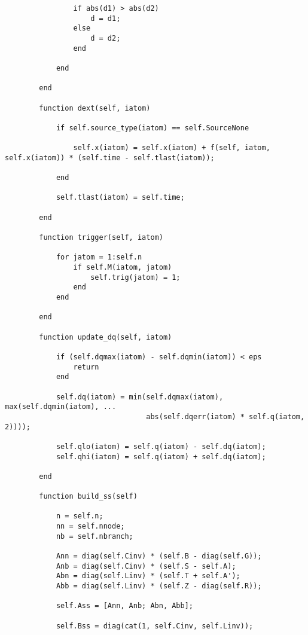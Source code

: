 \begin{lstlisting}
                if abs(d1) > abs(d2)
                    d = d1;
                else
                    d = d2;
                end
                
            end
        
        end
        
        function dext(self, iatom)
            
            if self.source_type(iatom) == self.SourceNone
                
                self.x(iatom) = self.x(iatom) + f(self, iatom, self.x(iatom)) * (self.time - self.tlast(iatom));
            
            end
            
            self.tlast(iatom) = self.time;

        end 
        
        function trigger(self, iatom)
            
            for jatom = 1:self.n
                if self.M(iatom, jatom)
                    self.trig(jatom) = 1;
                end
            end
            
        end
        
        function update_dq(self, iatom)
            
            if (self.dqmax(iatom) - self.dqmin(iatom)) < eps
                return
            end
            
            self.dq(iatom) = min(self.dqmax(iatom), max(self.dqmin(iatom), ...
                                 abs(self.dqerr(iatom) * self.q(iatom, 2)))); 
            
            self.qlo(iatom) = self.q(iatom) - self.dq(iatom);
            self.qhi(iatom) = self.q(iatom) + self.dq(iatom);
            
        end
            
        function build_ss(self)
            
            n = self.n;
            nn = self.nnode;
            nb = self.nbranch;

            Ann = diag(self.Cinv) * (self.B - diag(self.G));
            Anb = diag(self.Cinv) * (self.S - self.A);
            Abn = diag(self.Linv) * (self.T + self.A');
            Abb = diag(self.Linv) * (self.Z - diag(self.R));
            
            self.Ass = [Ann, Anb; Abn, Abb];
            
            self.Bss = diag(cat(1, self.Cinv, self.Linv));
            

\end{lstlisting}

